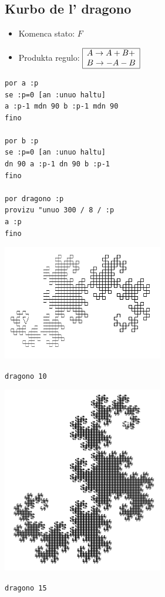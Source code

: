 \subsection{Kurbo de l' dragono}
\begin{itemize}
 \item[\textbullet] Komenca stato: $F$\\
 \item[\textbullet] Produkta regulo: $\begin{array}{|l|}
\hline
A\rightarrow A+B+ \\
B\rightarrow -A-B \\
\hline
\end{array}$ 
\end{itemize}
\begin{verbatim}
por a :p
se :p=0 [an :unuo haltu]
a :p-1 mdn 90 b :p-1 mdn 90
fino

por b :p
se :p=0 [an :unuo haltu]
dn 90 a :p-1 dn 90 b :p-1
fino

por dragono :p
provizu "unuo 300 / 8 / :p  
a :p
fino
\end{verbatim}
\begin{center}
 \begin{minipage}{7cm}
 \includegraphics[width=7cm]{bildoj/linden-dragon10.png}
 \begin{center}
  \texttt{dragono 10}
 \end{center}
\end{minipage}
 \begin{minipage}{7cm}
 \includegraphics[width=7cm]{bildoj/linden-dragon15.png}
 \begin{center}
  \texttt{dragono 15}
 \end{center}
\end{minipage}
\end{center}

